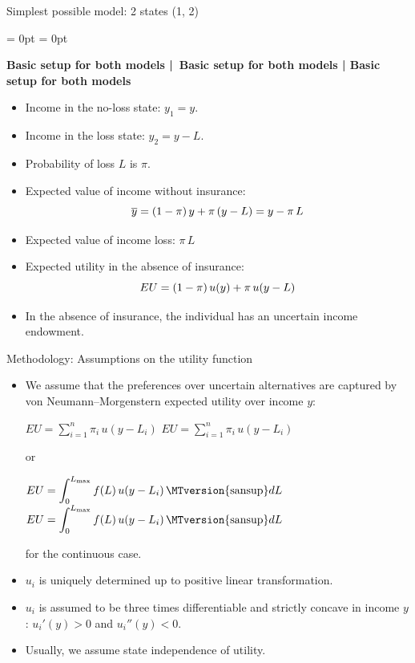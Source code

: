\documentclass[aspectratio = 169, t, 10pt]{beamer}
\renewcommand{\mathrm}[1]{\textrm{\MTversion{sansup}\(#1\)}}%
\begin{document}
\begin{frame}{Simplest possible model: 2 states (1, 2)}

\begin{list}{}{\leftmargin = 0pt \itemindent = 0pt}
\item \textbf{Basic setup for both models | Basic setup for both models | Basic setup for both models}
\end{list}

\begin{itemize}
	\item Income in the no-loss state: $y_1 = y$.
	\item Income in the loss state: $y_2 = y - L$.
	\item Probability of loss $L$ is $\pi$.
	\item Expected value of income without insurance:
		\vspace{-\smallskipamount}
		$$\overline{y} = (1 - \pi)\,y + \pi\,(y - L) = y - \pi\,L\vspace{-\smallskipamount}$$
	\item Expected value of income loss: $\pi\,L$
	\item Expected utility in the absence of insurance:
		\vspace{-\smallskipamount}
		$$EU = (1 - \pi)\,u(y) + \pi\,u(y - L)\vspace{-\smallskipamount}$$
	\item In the absence of insurance, the individual has an uncertain income endowment.
\end{itemize}

\end{frame}


\begin{frame}[allowframebreaks]{Methodology: Assumptions on the utility function}

\begin{itemize}
	\item We assume that the preferences over uncertain alternatives are captured by von Neumann--Morgenstern expected utility over income $y$: \par
	\medskip
	\centerline{
		$\displaystyle EU = \sum_{i=1}^{n} \pi_i \, u(y-L_i)$
		\quad\color{AlertColor}
		\boldmath$\displaystyle EU = \sum_{i=1}^{n} \pi_i \, u(y-L_i)$\unboldmath
	} \par
	\smallskip
	or \par
	\smallskip
	\centerline{
		$\displaystyle EU =\int_{0}^{L_{\max}} f(L)\, u(y-L_i) \, \mathrm{d}L$
		\quad\color{AlertColor}
		\boldmath$\displaystyle EU =\int_{0}^{L_{\max}} f(L)\, u(y-L_i) \, \mathrm{d}L$\unboldmath
	} \par
	\medskip
	for the continuous case.
	\item $u_i$ is uniquely determined up to positive linear transformation.
	\item $u_i$ is assumed to be three times differentiable and strictly concave in income $y$: ${u_i'(y) > 0}$ and ${u_i''(y) < 0}$.
	\item Usually, we assume state independence of utility.
\end{itemize}

\end{frame}
\end{document}
